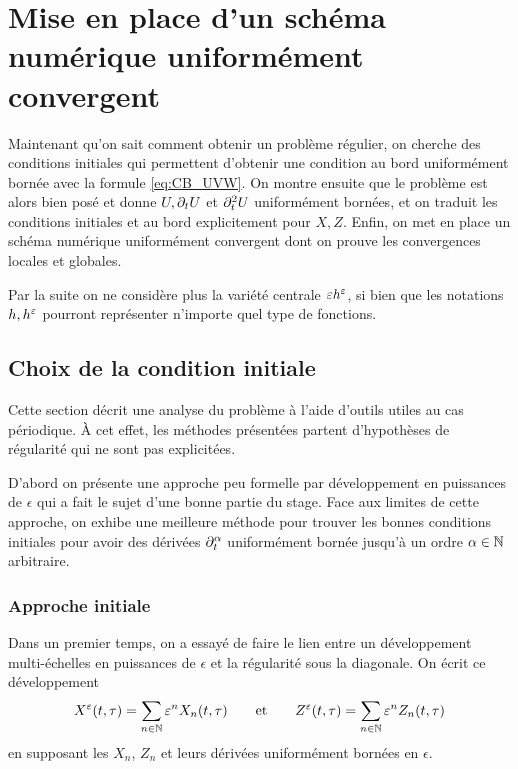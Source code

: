 \chapter{Mise en place d'un schéma numérique uniformément convergent}

Maintenant qu'on sait comment obtenir un problème régulier, on cherche des conditions initiales qui permettent d'obtenir une condition au bord uniformément bornée avec la formule \eqref{eq:CB_UVW}. 
On montre ensuite que le problème est alors bien posé et donne $U, \partial_t U$ et $\partial_t^2 U$ uniformément bornées, et on traduit les conditions initiales et au bord explicitement pour $X,Z$. 
Enfin, on met en place un schéma numérique uniformément convergent dont on prouve les convergences locales et globales. 

Par la suite on ne considère plus la variété centrale $\varepsilon h^{\varepsilon}$, si bien que les notations $h,h^{\varepsilon}$ pourront représenter n'importe quel type de fonctions. 


\section{Choix de la condition initiale}

Cette section décrit une analyse du problème à l'aide d'outils utiles au cas périodique. 
À cet effet, les méthodes présentées partent d'hypothèses de régularité qui ne sont pas explicitées. 

D'abord on présente une approche peu formelle par développement en puissances de $\epsilon$ qui a fait le sujet d'une bonne partie du stage. 
Face aux limites de cette approche, on exhibe une meilleure méthode pour trouver les bonnes conditions initiales pour avoir des dérivées $\partial_t^{\alpha}$ uniformément bornée jusqu'à un ordre $\alpha\in\mathbb{N}$ arbitraire. 
 

\subsection{Approche initiale}

Dans un premier temps, on a essayé de faire le lien entre un développement multi-échelles en puissances de $\epsilon$ et la régularité sous la diagonale. On écrit ce développement 
$$ X^{\varepsilon}(t,\tau) = \sum_{n\in\mathbb{N}} \varepsilon^n X_n(t,\tau) 
\qquad \text{et} \qquad
Z^{\varepsilon}(t,\tau) = \sum_{n\in\mathbb{N}} \varepsilon^n Z_n(t,\tau) $$
en supposant les $X_n$, $Z_n$ et leurs dérivées uniformément bornées en $\epsilon$. \\

